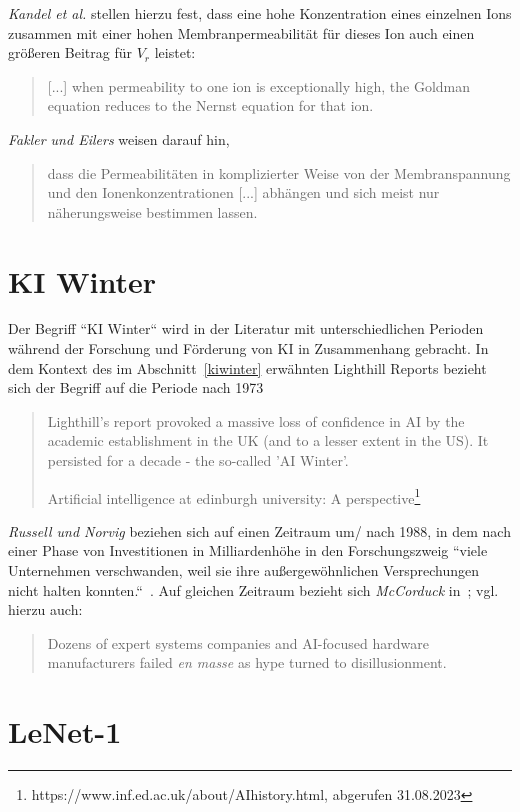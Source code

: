 {\textit{Kandel et al.} stellen hierzu fest, dass eine hohe Konzentration eines einzelnen Ions zusammen mit einer hohen Membranpermeabilität für dieses Ion auch einen größeren Beitrag für $V_r$ leistet:

\blockquote[{\cite[135]{KSJ+13}}]{
    {[...]} when permeability to one ion is exceptionally high, the Goldman equation reduces to the Nernst equation for that ion.
}

\textit{Fakler und Eilers} weisen darauf hin,

\blockquote[{\cite[67]{FE19}}]{
    dass die Permeabilitäten in komplizierter Weise von der Membranspannung und den Ionenkonzentrationen {[...]} abhängen und sich meist nur näherungsweise bestimmen lassen.
}




\section{KI Winter}\label{appendix:kiwinter}

Der Begriff ``KI Winter`` wird in der Literatur mit unterschiedlichen Perioden während der Forschung und Förderung von KI in Zusammenhang gebracht.
In dem Kontext des im Abschnitt~\ref{kiwinter} erwähnten Lighthill Reports bezieht sich der Begriff auf die Periode nach 1973

\blockquote[Artificial intelligence at edinburgh university: A perspective\footnote{https://www.inf.ed.ac.uk/about/AIhistory.html, abgerufen 31.08.2023}]{
    Lighthill's report provoked a massive loss of confidence in AI by the academic establishment in the UK (and to a lesser extent in the US). It persisted for a decade - the so-called 'AI Winter'.
}

\noindent
\textit{Russell und Norvig} beziehen sich auf einen Zeitraum um/ nach 1988, in dem nach einer Phase von Investitionen in Milliardenhöhe in den Forschungszweig ``viele Unternehmen verschwanden, weil sie ihre außergewöhnlichen Versprechungen nicht halten konnten.``~\cite[48]{RN09}. Auf gleichen Zeitraum bezieht sich \textit{McCorduck} in~\cite[432]{Mcc04}; vgl. hierzu auch:

\blockquote[{\cite[656]{Gar19}}]{
    Dozens of expert systems companies and AI-focused hardware manufacturers failed \textit{en masse} as hype turned to disillusionment.
}



\section{LeNet-1}\label{appendix:lenet1}

}
